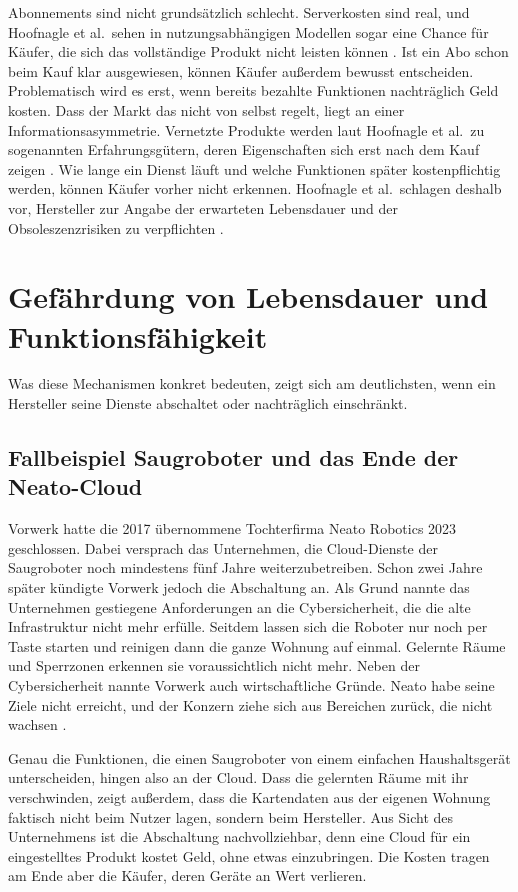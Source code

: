 Abonnements sind nicht grundsätzlich schlecht. Serverkosten sind real, und
Hoofnagle et al.\ sehen in nutzungsabhängigen Modellen sogar eine Chance für
Käufer, die sich das vollständige Produkt nicht leisten können
\cite[S.~807]{hoofnagle:2019}. Ist ein Abo schon beim Kauf klar ausgewiesen,
können Käufer außerdem bewusst entscheiden. Problematisch wird es erst, wenn
bereits bezahlte Funktionen nachträglich Geld kosten. Dass der Markt das nicht
von selbst regelt, liegt an einer Informationsasymmetrie. Vernetzte Produkte
werden laut Hoofnagle et al.\ zu sogenannten Erfahrungsgütern, deren Eigenschaften sich erst nach dem Kauf zeigen \cite[S.~809]{hoofnagle:2019}. Wie
lange ein Dienst läuft und welche Funktionen später kostenpflichtig werden,
können Käufer vorher nicht erkennen. Hoofnagle et al.\ schlagen deshalb vor,
Hersteller zur Angabe der erwarteten Lebensdauer und der Obsoleszenzrisiken zu
verpflichten \cite[S.~866]{hoofnagle:2019}.

\section{Gefährdung von Lebensdauer und Funktionsfähigkeit}\label{sec:cloud-folgen}

Was diese Mechanismen konkret bedeuten, zeigt sich am deutlichsten, wenn ein
Hersteller seine Dienste abschaltet oder nachträglich einschränkt.

\subsection{Fallbeispiel Saugroboter und das Ende der Neato-Cloud}\label{sec:cloud-neato}

Vorwerk hatte die 2017 übernommene Tochterfirma Neato Robotics 2023
geschlossen. Dabei versprach das Unternehmen, die Cloud-Dienste der
Saugroboter noch mindestens fünf Jahre weiterzubetreiben. Schon zwei Jahre
später kündigte Vorwerk jedoch die Abschaltung an. Als Grund nannte das
Unternehmen gestiegene Anforderungen an die Cybersicherheit, die die alte
Infrastruktur nicht mehr erfülle. Seitdem lassen sich die Roboter nur noch per
Taste starten und reinigen dann die ganze Wohnung auf einmal. Gelernte Räume
und Sperrzonen erkennen sie voraussichtlich nicht mehr. Neben der
Cybersicherheit nannte Vorwerk auch wirtschaftliche Gründe. Neato habe seine
Ziele nicht erreicht, und der Konzern ziehe sich aus Bereichen zurück, die nicht
wachsen \cite{heise:2025neato}.

Genau die Funktionen, die einen Saugroboter von einem einfachen Haushaltsgerät
unterscheiden, hingen also an der Cloud. Dass die gelernten Räume mit ihr
verschwinden, zeigt außerdem, dass die Kartendaten aus der eigenen Wohnung faktisch nicht beim Nutzer lagen, sondern beim Hersteller. Aus Sicht des Unternehmens
ist die Abschaltung nachvollziehbar, denn eine Cloud für ein eingestelltes
Produkt kostet Geld, ohne etwas einzubringen. Die Kosten tragen am Ende aber die
Käufer, deren Geräte an Wert verlieren.

